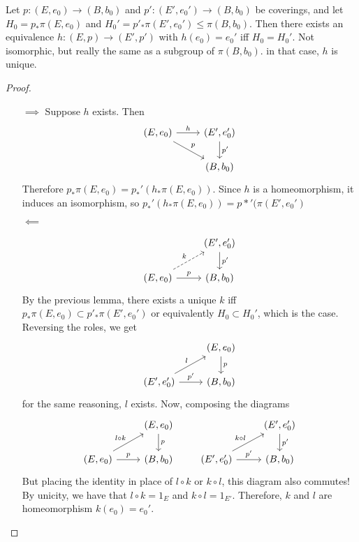 \begin{theorem}[74.2]
    Let $p: (E, e_0) \to  (B, b_0)$ and $p': (E', e_0') \to (B, b_0)$ be coverings,
    and let $H_0 = p_* \pi(E,e_0) $ and $H_0' = p'_* \pi(E',e_0') \le \pi(B,b_0)$.
    Then there exists an equivalence $h: (E, p) \to  (E', p')$ with $h(e_0) = e_0'$ iff $H_0 = H_0'$.
    Not isomorphic, but really the same as a subgroup of $\pi(B,b_0) $.
    in that case, $h$ is unique.
\end{theorem}
\begin{proof}
    \begin{itemize}
        \item[$\boxed{\implies}$] Suppose $h$ exists.
            Then 
            \[
                \begin{tikzcd}
                    (E, e_0) \arrow[r, "h"] \arrow[dr, "p"]& (E', e_0') \arrow[d, "p'"]\\
                                                           & (B, b_0)
                \end{tikzcd}
            \]
            Therefore $p_* \pi(E,e_0)  = p_*' ( h_*\pi(E,e_0) )$.
            Since $h$ is a homeomorphism, it induces an isomorphism, so $p_*' ( h_* \pi(E,e_0))  = p*'(\pi(E',e_0') $
        \item[$\boxed{\impliedby}$]

            \[
                \begin{tikzcd}
                    & (E', e'_0) \arrow[d, "p'"]\\
                    (E, e_0) \arrow[ur, dashed, "k"]\arrow[r, "p"] & (B, b_0)
                \end{tikzcd}
            \]
            By the previous lemma, there exists a unique $k$ iff $p_* \pi(E,e_0)  \subset p'_* \pi(E',e_0')$ or equivalently $H_0 \subset H_0'$, which is the case.
            Reversing the roles, we get
            \[
                \begin{tikzcd}
                    & (E, e_0) \arrow[d, "p"]\\
                    (E', e'_0) \arrow[ur, "l"] \arrow[r, "p'"] & (B, b_0)
                \end{tikzcd}
            \]
            for the same reasoning, $l$ exists.
            Now, composing the diagrams
            \[
                \begin{tikzcd}
                & (E, e_0) \arrow[d, "p"] \\
                    (E, e_0) \arrow[ur, "l  \circ  k"] \arrow[r, "p"] &(B, b_0)
            \end{tikzcd}\qquad
                \begin{tikzcd}
                    & (E', e_0') \arrow[d, "p'"]\\
                    (E', e'_0) \arrow[ur, "k  \circ  l"] \arrow[r, " p' "] &(B, b_0)
                \end{tikzcd}
            \] 
            But placing the identity in place of $l  \circ  k$ or $k  \circ  l$, this diagram also commutes! By unicity, we have that $ l \circ k = 1_E$ and $ k  \circ l = 1_{E'}$.
            Therefore, $k$ and $l$ are homeomorphism $k(e_0) = e_0'$.


\end{itemize}
\end{proof}
